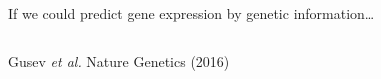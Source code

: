 \documentclass[
  ignorenonframetext,
  aspectratio=169]{beamer}
\begin{document}
\begin{frame}{If we could predict gene expression by genetic
information\ldots{}}
\protect\hypertarget{if-we-could-predict-gene-expression-by-genetic-information}{}
\begin{columns}[T]
\begin{column}{.45\textwidth}
\scriptsize


\normalsize

\tiny Gusev \emph{et al.} Nature Genetics (2016)
\end{column}

\begin{column}{.45\textwidth}
\scriptsize

\end{column}
\end{columns}
\end{frame}
\end{document}
